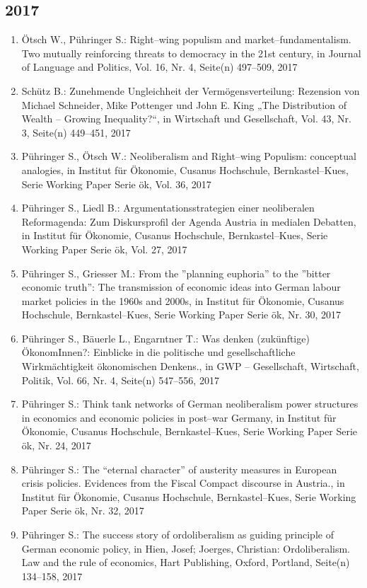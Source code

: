 \subsection*{2017}
\begin{enumerate}
    	 \item Ötsch W., Pühringer S.: Right--wing populism and market--fundamentalism. Two mutually reinforcing threats to democracy in the 21st century, in Journal of Language and Politics, Vol. 16, Nr. 4, Seite(n) 497--509, 2017
	 \item Schütz B.: Zunehmende Ungleichheit der Vermögensverteilung: Rezension von Michael Schneider, Mike Pottenger und John E. King „The Distribution of Wealth – Growing Inequality?“, in Wirtschaft und Gesellschaft, Vol. 43, Nr. 3, Seite(n) 449--451, 2017
	 \item Pühringer S., Ötsch W.: Neoliberalism and Right--wing Populism: conceptual analogies, in Institut für Ökonomie, Cusanus Hochschule, Bernkastel--Kues, Serie Working Paper Serie ök, Vol. 36, 2017
	 \item Pühringer S., Liedl B.: Argumentationsstrategien einer neoliberalen Reformagenda: Zum Diskursprofil der Agenda Austria in medialen Debatten, in Institut für Ökonomie, Cusanus Hochschule, Bernkastel--Kues, Serie Working Paper Serie ök, Vol. 27, 2017
	 \item Pühringer S., Griesser M.: From the ''planning euphoria'' to the ''bitter economic truth'': The transmission of economic ideas into German labour market policies in the 1960s and 2000s, in Institut für Ökonomie, Cusanus Hochschule, Bernkastel--Kues, Serie Working Paper Serie ök, Nr. 30, 2017
	 \item Pühringer S., Bäuerle L., Engarntner T.: Was denken (zukünftige) ÖkonomInnen?: Einblicke in die politische und gesellschaftliche Wirkmächtigkeit ökonomischen Denkens., in GWP -- Gesellschaft, Wirtschaft, Politik, Vol. 66, Nr. 4, Seite(n) 547--556, 2017
	 \item Pühringer S.: Think tank networks of German neoliberalism power structures in economics and economic policies in post--war Germany, in Institut für Ökonomie, Cusanus Hochschule, Bernkastel--Kues, Serie Working Paper Serie ök, Nr. 24, 2017
	 \item Pühringer S.: The “eternal character” of austerity measures in European crisis policies. Evidences from the Fiscal Compact discourse in Austria., in Institut für Ökonomie, Cusanus Hochschule, Bernkastel--Kues, Serie Working Paper Serie ök, Nr. 32, 2017
	 \item Pühringer S.: The success story of ordoliberalism as guiding principle of German economic policy, in Hien, Josef; Joerges, Christian: Ordoliberalism. Law and the rule of economics, Hart Publishing, Oxford, Portland, Seite(n) 134--158, 2017

\end{enumerate}
